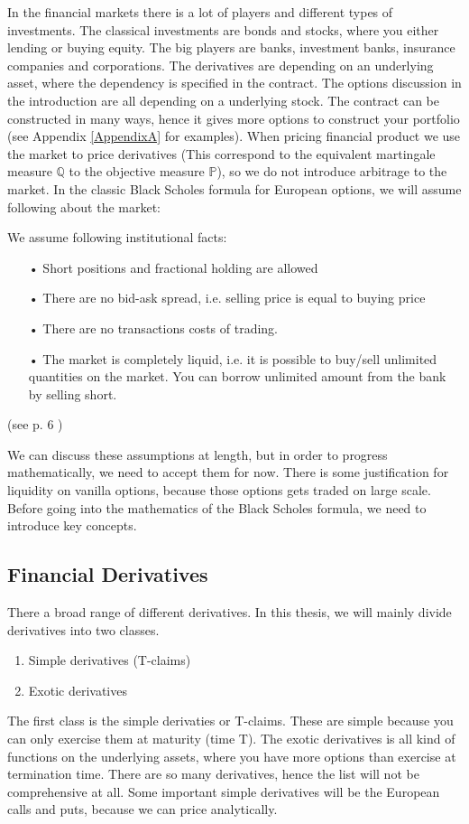 In the financial markets there is a lot of players and different types of investments. The classical investments are bonds and stocks, where you either lending or buying equity. The big players are banks, investment banks, insurance companies and corporations. The derivatives are depending on an underlying asset, where the dependency is specified in the contract. The options discussion in the introduction are all depending on a underlying stock. The contract can be constructed in many ways, hence it gives more options to construct your portfolio (see Appendix \ref{AppendixA} for examples). When pricing financial product we use the market to price derivatives (This correspond to the equivalent martingale measure $\mathbb{Q}$ to the objective measure $\mathbb{P}$), so we do not introduce arbitrage to the market. In the classic Black Scholes formula for European options, we will assume following about the market:
\theoremstyle{assumption}
\begin{assumption}{}\label{EfficientMarket}
We assume following institutional facts:
\begin{enumerate}
\item[•] Short positions and fractional holding are allowed 
\item[•] There are no bid-ask spread, i.e. selling price is equal to buying price
\item[•] There are no transactions costs of trading.
\item[•] The market is completely liquid, i.e. it is possible to buy/sell unlimited quantities on the market. You can borrow unlimited amount from the bank by selling short.
\end{enumerate}
(see p. 6 \parencite{finKont})
\end{assumption}
We can discuss these assumptions at length, but in order to progress mathematically, we need to accept them for now. There is some justification for liquidity on vanilla options, because those options gets traded on large scale. Before going into the mathematics of the Black Scholes formula, we need to introduce key concepts.

\subsection{Financial Derivatives}
There a broad range of different derivatives. In this thesis, we will mainly divide derivatives into two classes. 
\begin{enumerate}
\item Simple derivatives (T-claims)
\item Exotic derivatives
\end{enumerate}
The first class is the simple derivaties or T-claims. These are simple because you can only exercise them at maturity (time T). The exotic derivatives is all kind of functions on the underlying assets, where you have more options than exercise at termination time. There are so many derivatives, hence the list will not be comprehensive at all. Some important simple derivatives will be the European calls and puts, because we can price analytically.

